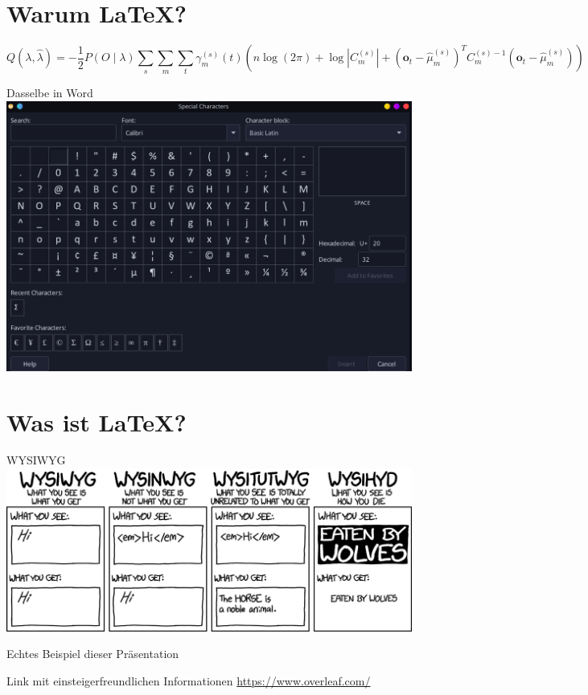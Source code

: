 \documentclass{beamer}
\begin{document}
  \section{Warum \LaTeX?}
  \begin{frame}
\begin{dmath}
  Q(\lambda,\hat{\lambda}) = -\frac{1}{2} P{(O \mid \lambda )} \sum_s \sum_m \sum_t \gamma_m^{(s)} (t) \left( n \log(2 \pi ) + \log \left| C_m^{(s)} \right| + \left( \mathbf{o}_t - \hat{\mu}_m^{(s)} \right) ^T C_m^{(s)-1} \left(\mathbf{o}_t - \hat{\mu}_m^{(s)}\right) \right)
\end{dmath}
\end{frame}
\begin{frame}{Dasselbe in Word}
\href{https://i.makeagif.com/media/5-28-2022/dXcfrH.gif}{\includegraphics[width=\textwidth]{FormelnWord.png}}
\end{frame}

  \section{Was ist \LaTeX?}
  \begin{frame}{WYSIWYG}
    \includegraphics[width=\textwidth]{types_of_editors_2x.png}
  \end{frame}
  \begin{frame}{Echtes Beispiel dieser Präsentation}
  \end{frame}
\begin{frame}{Link mit einsteigerfreundlichen Informationen}
\href{Link mit einsteigerfreundlichen Informationen}{https://www.overleaf.com/}
\end{frame}
\end{document}
